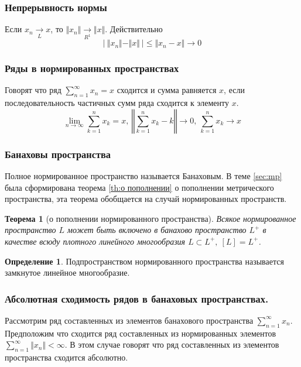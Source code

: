 \documentclass[14pt]{extarticle}
\newtheorem{theorem}{Теорема}[section]
\theoremstyle{definition}
\newtheorem{definition}{Определение}[section]
\theoremstyle{remark}
\renewcommand{\[}{\begin{dmath*}[compact]}
\renewcommand{\]}{\end{dmath*}}
\newcommand{\sep}{ , \ \allowbreak }
\begin{document}
\subsubsection{Непрерывность нормы}

Если $x_n \xrightarrow[L]{} x$, то $ \Vert x_n \Vert
\xrightarrow[R^1]{} \Vert x \Vert $. Действительно
\[{|\ \Vert x_n \Vert - \Vert x \Vert \ |} \allowbreak
\leq {\Vert x_n - x \Vert} \to 0\]

\subsubsection{Ряды в нормированных пространствах}

Говорят что ряд $\sum_{n=1}^\infty x_n = x$ сходится и сумма равняется $x$,
если последовательность частичных сумм ряда сходится к элементу $x$.
\[{\lim_{n \to \infty} \sum_{k=1}^n x_k = x} \sep
{\left \Vert \sum_{k=1}^n x_k - k \right \Vert \to 0} \sep
{\sum_{k=1}^n x_k \to x}\]

\subsubsection{Банаховы пространства}

Полное нормированное пространство называется Банаховым.
В теме \ref{sec:mp} была сформирована теорема \ref{th:о пополнении}
о пополнении метрического пространства,
эта теорема обобщается на случай нормированных пространств.

\begin{theorem}[о пополнении нормированного пространства]
  Всякое нормированное пространство $L$ может быть включено в банахово
  пространство $L^+$ в качестве всюду плотного линейного многообразия
  $L \subset L^+ \sep [L]=L^+$.
\end{theorem}

\begin{definition}
  Подпространством нормированного пространства называется
  замкнутое линейное многообразие.
\end{definition}

\subsubsection{Абсолютная сходимость рядов в банаховых пространствах.}

Рассмотрим ряд составленных из элементов банахового пространства
$\sum_{n=1}^\infty x_n$.
Предположим что сходится ряд составленных из нормированных элементов
$\sum_{n=1}^\infty \Vert x_n \Vert < \infty$.
В этом случае говорят что ряд составленных из элементов пространства
сходится абсолютно.
\end{document}
